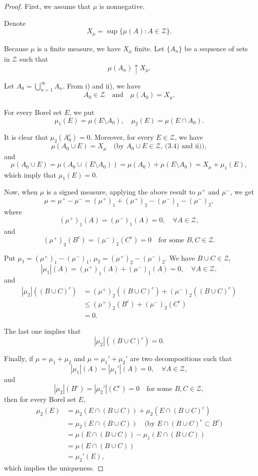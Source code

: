 \documentclass[a4paper, 11pt]{report}
\theoremstyle{definition}\newtheorem*{rmk}{Remark}
\begin{document}
\begin{proof}
\mbox{}

First, we assume that $\mu$ is nonnegative.

Denote
\[
X_{\mu} = \sup \{\mu(A): A\in \mathcal{Z}\}.
\]

Because $\mu$ is a finite measure, we have $X_{\mu}$ finite. Let $\{A_n\}$ be a sequence of sets in $\mathcal{Z}$ such that
\[
\mu(A_n) \uparrow X_{\mu}.
\]

Let $A_0 = \bigcup\limits_{n=1}^{\infty} A_n$. From i) and ii), we have
\begin{equation}\label{331}
A_0 \in \mathcal{Z} \quad\text{and}\quad\mu(A_0) = X_{\mu}.
\end{equation}

For every Borel set $E$, we put
\[
\mu_1(E) = \mu(E\setminus A_0),\quad \mu_2(E) = \mu(E\cap A_0).
\]

It is clear that $\mu_2(A_0^c) = 0$. Moreover, for every $E\in \mathcal{Z}$, we have
\[
\mu(A_0\cup E) = X_{\mu}\quad\text{(by } A_0 \cup E \in \mathcal{Z}\text{, (3.4) and ii))},
\]
and
\[
\mu(A_0 \cup E) = \mu(A_0 \cup (E \setminus A_0)) = \mu(A_0) + \mu(E\setminus A_0) = X_{\mu} + \mu_1(E),
\]
which imply that $\mu_1(E) = 0$.

Now, when $\mu$ is a signed measure, applying the above result to $\mu^+$ and $\mu^-$, we get
\[
\mu = \mu^+ - \mu^- = (\mu^+)_1 + (\mu^+)_2 - (\mu^-)_1 - (\mu^-)_2,
\]
where
\[
(\mu^+)_1(A) = (\mu^-)_1(A) = 0, \quad \forall A \in \mathcal{Z},
\]
and 
\[
(\mu^+)_2(B^c) = (\mu^-)_2(C^c) = 0 \quad \text{for some }B,C \in \mathcal{Z}.
\]

Put $\mu_1 = (\mu^+)_1 - (\mu^-)_1$, $\mu_2 = (\mu^+)_2 - (\mu^-)_2$. We have $B \cup C \in \mathcal{Z}$,
\[
|\mu_1|(A) = (\mu^+)_1(A) + (\mu^-)_1(A) = 0, \quad \forall A\in\mathcal{Z},
\]
and
\begin{align*}
|\mu_2|((B\cup C)^c) &= (\mu^+)_2((B\cup C)^c) + (\mu^-)_2((B\cup C)^c)\\
&\le (\mu^+)_2(B^c) + (\mu^-)_2(C^c)\\
&= 0.
\end{align*}

The last one implies that
\[
|\mu_2|((B\cup C)^c) = 0.
\]

Finally, if $\mu = \mu_1 + \mu_2$ and $\mu = \mu_1' + \mu_2'$ are two decompositions such that
\[
|\mu_1|(A) = |\mu_1'|(A) = 0, \quad \forall A\in \mathcal{Z},
\]
and
\[
|\mu_2|(B^c) = |\mu_2'|(C^c) = 0 \quad \text{for some }B, C\in \mathcal{Z},
\]
then for every Borel set $E$,
\begin{align*}
\mu_2(E) &= \mu_2(E\cap (B\cup C)) + \mu_2(E\cap (B\cup C)^c)\\
&= \mu_2 (E\cap (B\cup C))\quad \text{(by }E\cap (B\cup C)^c \subset B^c\text{)}\\
&= \mu(E\cap (B\cup C)) - \mu_1(E\cap (B\cup C))\\
&= \mu(E\cap (B\cup C))\\
&= \mu_2'(E),
\end{align*}
which implies the uniqueness.
\end{proof}
\end{document}
